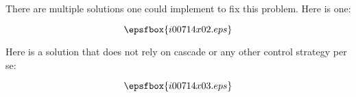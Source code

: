 
There are multiple solutions one could implement to fix this problem.  Here is one:

$$\epsfbox{i00714x02.eps}$$







Here is a solution that does not rely on cascade or any other control strategy per se:

$$\epsfbox{i00714x03.eps}$$




